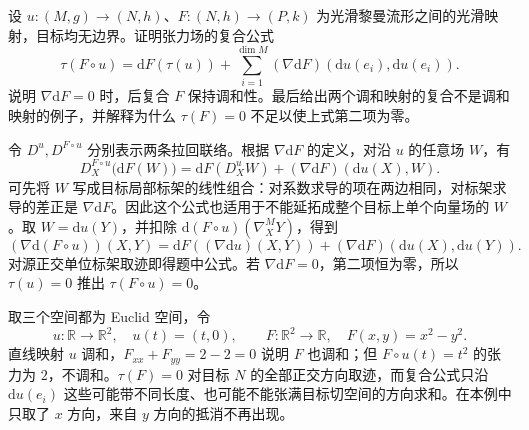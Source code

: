 \begin{exercise}\label{g3:ex:tension-composition-chain-rule}
	设 \(u:(M,g)\to(N,h)\)、\(F:(N,h)\to(P,k)\) 为光滑黎曼流形之间的光滑映射，目标均无边界。证明张力场的复合公式
	\[
		\tau(F\circ u)=\mathrm dF(\tau(u))
		+\sum_{i=1}^{\dim M}(\nabla\mathrm dF)(\mathrm du(e_i),\mathrm du(e_i)).
	\]
	说明 \(\nabla\mathrm dF=0\) 时，后复合 \(F\) 保持调和性。最后给出两个调和映射的复合不是调和映射的例子，并解释为什么 \(\tau(F)=0\) 不足以使上式第二项为零。
\end{exercise}
\begin{solution}
	令 \(D^u,D^{F\circ u}\) 分别表示两条拉回联络。根据 \(\nabla\mathrm dF\) 的定义，对沿 \(u\) 的任意场 \(W\)，有
	\[
		D^{F\circ u}_X\bigl(\mathrm dF(W)\bigr)
		=\mathrm dF(D^u_XW)+(\nabla\mathrm dF)(\mathrm du(X),W).
	\]
	可先将 \(W\) 写成目标局部标架的线性组合：对系数求导的项在两边相同，对标架求导的差正是 \(\nabla\mathrm dF\)。因此这个公式也适用于不能延拓成整个目标上单个向量场的 \(W\)。取 \(W=\mathrm du(Y)\)，并扣除 \(\mathrm d(F\circ u)(\nabla^M_XY)\)，得到
	\[
		(\nabla\mathrm d(F\circ u))(X,Y)
		=\mathrm dF((\nabla\mathrm du)(X,Y))
		+(\nabla\mathrm dF)(\mathrm du(X),\mathrm du(Y)).
	\]
	对源正交单位标架取迹即得题中公式。若 \(\nabla\mathrm dF=0\)，第二项恒为零，所以 \(\tau(u)=0\) 推出 \(\tau(F\circ u)=0\)。

	取三个空间都为 Euclid 空间，令
	\[
		u:\mathbb R\to\mathbb R^2,\quad u(t)=(t,0),
		\qquad F:\mathbb R^2\to\mathbb R,\quad F(x,y)=x^2-y^2.
	\]
	直线映射 \(u\) 调和，\(F_{xx}+F_{yy}=2-2=0\) 说明 \(F\) 也调和；但 \(F\circ u(t)=t^2\) 的张力为 \(2\)，不调和。\(\tau(F)=0\) 对目标 \(N\) 的全部正交方向取迹，而复合公式只沿 \(\mathrm du(e_i)\) 这些可能带不同长度、也可能不能张满目标切空间的方向求和。在本例中只取了 \(x\) 方向，来自 \(y\) 方向的抵消不再出现。
\end{solution}


